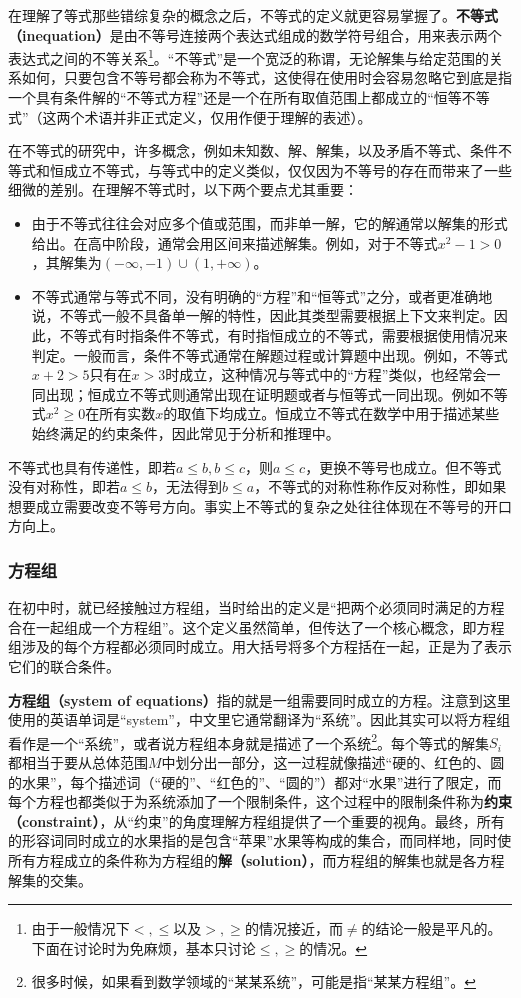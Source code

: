 在理解了等式那些错综复杂的概念之后，不等式的定义就更容易掌握了。\textbf{不等式（inequation）}是由不等号连接两个表达式组成的数学符号组合，用来表示两个表达式之间的不等关系\footnote{由于一般情况下$<,\leq$以及$>,\geq$的情况接近，而$\neq$的结论一般是平凡的。下面在讨论时为免麻烦，基本只讨论$\leq,\geq$的情况。}。“不等式”是一个宽泛的称谓，无论解集与给定范围的关系如何，只要包含不等号都会称为不等式，这使得在使用时会容易忽略它到底是指一个具有条件解的“不等式方程”还是一个在所有取值范围上都成立的“恒等不等式”（这两个术语并非正式定义，仅用作便于理解的表述）。

在不等式的研究中，许多概念，例如未知数、解、解集，以及矛盾不等式、条件不等式和恒成立不等式，与等式中的定义类似，仅仅因为不等号的存在而带来了一些细微的差别。在理解不等式时，以下两个要点尤其重要：
\begin{itemize}
\item 由于不等式往往会对应多个值或范围，而非单一解，它的解通常以解集的形式给出。在高中阶段，通常会用区间来描述解集。例如，对于不等式$x^2 - 1 > 0$，其解集为$(-\infty, -1) \cup (1, +\infty)$。
\item 不等式通常与等式不同，没有明确的“方程”和“恒等式”之分，或者更准确地说，不等式一般不具备单一解的特性，因此其类型需要根据上下文来判定。因此，不等式有时指条件不等式，有时指恒成立的不等式，需要根据使用情况来判定。一般而言，条件不等式通常在解题过程或计算题中出现。例如，不等式$x + 2 > 5$只有在$x > 3$时成立，这种情况与等式中的“方程”类似，也经常会一同出现；恒成立不等式则通常出现在证明题或者与恒等式一同出现。例如不等式$x^2 \geq 0$在所有实数$x$的取值下均成立。恒成立不等式在数学中用于描述某些始终满足的约束条件，因此常见于分析和推理中。
\end{itemize}

不等式也具有传递性，即若$a\leq b,b\leq c$，则$a\leq c$，更换不等号也成立。但不等式没有对称性，即若$a\leq b$，无法得到$b\leq a$，不等式的对称性称作反对称性，即如果想要成立需要改变不等号方向。事实上不等式的复杂之处往往体现在不等号的开口方向上。

\subsubsection{方程组}

在初中时，就已经接触过方程组，当时给出的定义是“把两个必须同时满足的方程合在一起组成一个方程组”。这个定义虽然简单，但传达了一个核心概念，即方程组涉及的每个方程都必须同时成立。用大括号将多个方程括在一起，正是为了表示它们的联合条件。

\textbf{方程组（system of equations）}指的就是一组需要同时成立的方程。注意到这里使用的英语单词是“system”，中文里它通常翻译为“系统”。因此其实可以将方程组看作是一个“系统”，或者说方程组本身就是描述了一个系统\footnote{很多时候，如果看到数学领域的“某某系统”，可能是指“某某方程组”。}。每个等式的解集$S_i$都相当于要从总体范围$M$中划分出一部分，这一过程就像描述“硬的、红色的、圆的水果”，每个描述词（“硬的”、“红色的”、“圆的”）都对“水果”进行了限定，而每个方程也都类似于为系统添加了一个限制条件，这个过程中的限制条件称为\textbf{约束（constraint）}，从“约束”的角度理解方程组提供了一个重要的视角。最终，所有的形容词同时成立的水果指的是包含“苹果”水果等构成的集合，而同样地，同时使所有方程成立的条件称为方程组的\textbf{解（solution）}，而方程组的解集也就是各方程解集的交集。

